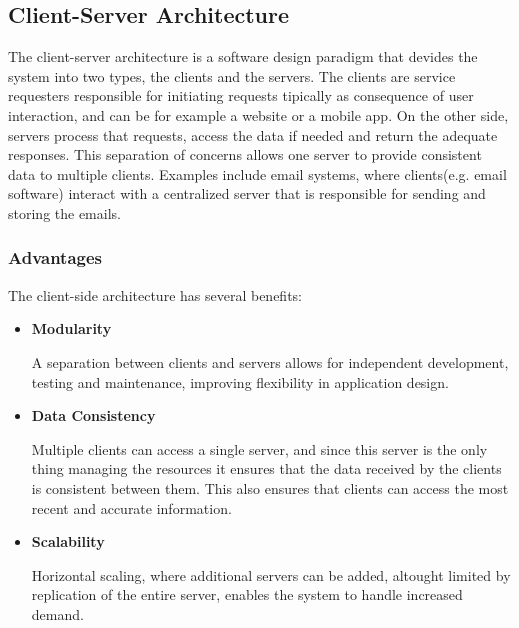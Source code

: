 \subsection{Client-Server Architecture}
The client-server architecture is a software design paradigm that devides the
system into two types, the clients and the servers. The clients are service
requesters responsible for initiating requests tipically as consequence of user
interaction, and can be for example a website or a mobile app. On the other
side, servers process that requests, access the data if needed and return the
adequate responses. This separation of concerns allows one server to provide
consistent data to multiple clients.
Examples include email systems, where clients(e.g. email software) interact with
a centralized server that is responsible for sending and storing the emails.

\subsubsection{Advantages}
The client-side architecture has several benefits:
\begin{itemize}
	\item \textbf{Modularity}

	      A separation between clients and servers allows for independent development,
	      testing and maintenance, improving flexibility in application design.

	\item \textbf{Data Consistency}

	      Multiple clients can access a single server, and since this server is the
	      only thing managing the resources it ensures that the data received by the
	      clients is consistent between them. This also ensures that clients can access
	      the most recent and accurate information.

	\item \textbf{Scalability}

	      Horizontal scaling, where additional servers can be added, altought limited
	      by replication of the entire server, enables the system to handle increased
	      demand.
\end{itemize}

